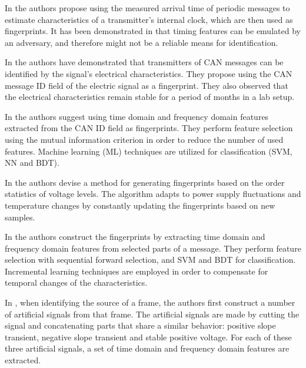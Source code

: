 \documentclass[conference]{IEEEtran}
\begin{document}
  
  In \cite{cho2016fingerprinting} the authors propose using the measured arrival time of periodic messages to estimate characteristics of a transmitter's internal clock, which are then used as fingerprints. It has been demonstrated in \cite{sagong2018cloaking} that timing features can be emulated by an adversary, and therefore might not be a reliable means for identification.
  
  In \cite{murvay2014source} the authors have demonstrated that transmitters of CAN messages can be identified by the signal's electrical characteristics. They propose using the CAN message ID field of the electric signal as a fingerprint. They also observed that the electrical characteristics remain stable for a period of months in a lab setup.
  
  In \cite{choi2018identifying} the authors suggest using time domain and frequency domain features extracted from the CAN ID field as fingerprints. They perform feature selection using the mutual information criterion in order to reduce the number of used features. Machine learning (ML) techniques are utilized for classification (SVM, NN and BDT).
  
  In \cite{cho2017viden} the authors devise a method for generating fingerprints based on the order statistics of voltage levels. The algorithm adapts to power supply fluctuations and temperature changes by constantly updating the fingerprints based on new samples.
  
  In \cite{choi2018voltageids} the authors construct the fingerprints by extracting time domain and frequency domain features from selected parts of a message. They perform feature selection with sequential forward selection, and SVM and BDT for classification. Incremental learning techniques \cite{diehl2003svm} are employed in order to compensate for temporal changes of the characteristics.
  
  In \cite{kneib2018scission}, when identifying the source of a frame, the authors first construct a number of artificial signals from that frame. The artificial signals are made by cutting the signal and concatenating parts that share a similar behavior: positive slope transient, negative slope transient and stable positive voltage. For each of these three artificial signals, a set of time domain and frequency domain features are extracted.
  
\end{document}
